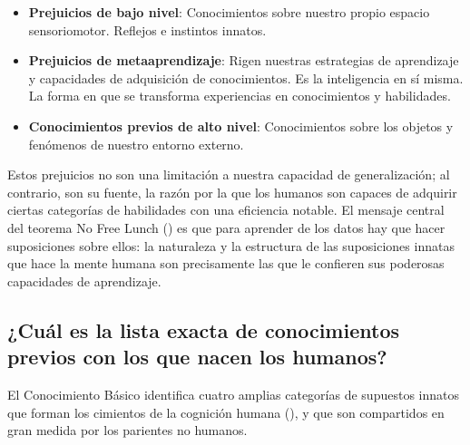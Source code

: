 \begin{itemize}
    \item \textbf{Prejuicios de bajo nivel}: Conocimientos sobre nuestro propio espacio sensoriomotor. Reflejos e instintos innatos.
    \item \textbf{Prejuicios de metaaprendizaje}: Rigen nuestras estrategias de aprendizaje y capacidades de adquisición de conocimientos. Es la inteligencia en sí misma. La forma en que se transforma experiencias en conocimientos y habilidades.
    \item \textbf{Conocimientos previos de alto nivel}: Conocimientos sobre los objetos y fenómenos de nuestro entorno externo.
\end{itemize}

Estos prejuicios no son una limitación a nuestra capacidad de generalización; al contrario, son su fuente, la razón por la que los humanos son capaces de adquirir ciertas categorías de habilidades con una eficiencia notable. El mensaje central del teorema No Free Lunch (\cite{wolpert1997no}) es que para aprender de los datos hay que hacer suposiciones sobre ellos: la naturaleza y la estructura de las suposiciones innatas que hace la mente humana son precisamente las que le confieren sus poderosas capacidades de aprendizaje. 

\subsection{¿Cuál es la lista exacta de conocimientos previos con los que nacen los humanos?}\label{section:state-of-the-art:a-good-measure-of-inteligence:human-prios}

El Conocimiento Básico identifica cuatro amplias categorías de supuestos innatos que forman los cimientos de la cognición humana  (\cite{spelke2007core}), y que son compartidos en gran medida por los parientes no humanos.

